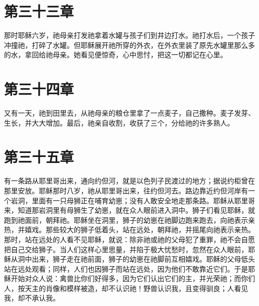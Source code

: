 
\section{第三十三章}

那时耶稣六岁，祂母亲打发祂拿着水罐与孩子们到井边打水。祂打水后，一个孩子冲撞祂，打碎了水罐。但耶稣展开祂所穿的外衣，在外衣里装了原先水罐里那么多的水，拿回给祂母亲。她看见便惊奇，心中思忖，把这一切都记在心里。\par


\section{第三十四章}

又有一天，祂到田里去，从祂母亲的粮仓里拿了一点麦子，自己撒种。麦子发芽、生长，并大大增加。最后，祂亲自收割，收获了三个，分给祂的许多熟人。\par


\section{第三十五章}

有一条路从耶里哥出来，通向约但河，就是以色列子民渡过的地方；据说约柜曾在那里安放。耶稣那时八岁，祂从耶里哥出来，往约但河去。路边靠近约但河岸有一个岩洞，里面有一只母狮正在哺育幼崽；没有人敢安全地走那条路。耶稣从耶里哥来，知道那岩洞里有母狮生了幼崽，就在众人眼前进入洞中。狮子们看见耶稣，就跑到祂面前，朝拜祂。耶稣坐在洞里，狮子的幼崽在祂脚边跑来跑去，向祂表示亲热，并嬉戏。那些较大的狮子低着头，站在远处，朝拜祂，并摇尾向祂表示亲热。那时，站在远处的人看不见耶稣，就说：除非祂或祂的父母犯了重罪，祂不会自愿把自己交给狮子。当人们这样心里思量，并陷于极大忧愁时，忽然在众人眼前，耶稣从洞中出来，狮子走在祂前面，狮子的幼崽在祂脚前互相嬉戏。耶稣的父母低头站在远处观看；同样，人们也因狮子而站在远处，因为他们不敢靠近它们。于是耶稣开始对众人说：禽兽比你们好得多，因为它们认出它们的主，并光荣祂；而你们人，按天主的肖像和模样被造，却不认识祂！野兽认识我，且变得驯良；人看见我，却不承认我。\par


